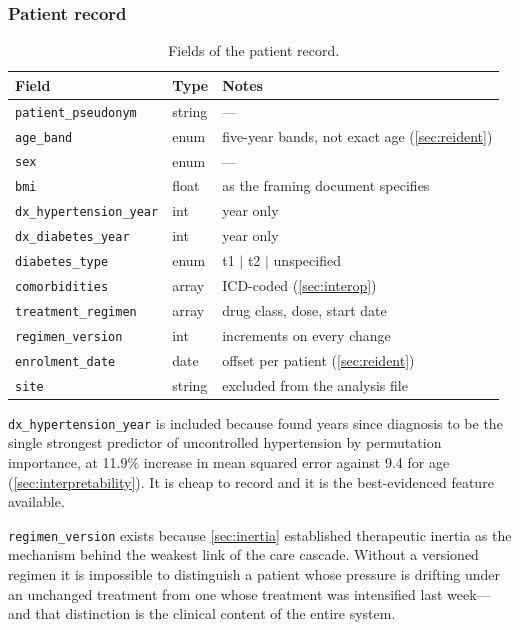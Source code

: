 \documentclass[12pt,a4paper,oneside]{report}
\begin{document}
\subsubsection{Patient record}

\begin{table}[htbp]
\centering\footnotesize
\caption{Fields of the patient record.}\label{tab:patient-record}
\begin{tabularx}{\textwidth}{@{}>{\raggedright\arraybackslash}p{3.4cm} >{\raggedright\arraybackslash}p{2.0cm} X@{}}
\toprule
\textbf{Field} & \textbf{Type} & \textbf{Notes} \\
\midrule
\texttt{patient\_pseudonym} & string & --- \\
\texttt{age\_band} & enum & five-year bands, not exact age (\cref{sec:reident}) \\
\texttt{sex} & enum & --- \\
\texttt{bmi} & float & as the framing document specifies \\
\texttt{dx\_hypertension\_year} & int & year only \\
\texttt{dx\_diabetes\_year} & int & year only \\
\texttt{diabetes\_type} & enum & t1 $\mid$ t2 $\mid$ unspecified \\
\texttt{comorbidities} & array & ICD-coded (\cref{sec:interop}) \\
\texttt{treatment\_regimen} & array & drug class, dose, start date \\
\texttt{regimen\_version} & int & increments on every change \\
\texttt{enrolment\_date} & date & offset per patient (\cref{sec:reident}) \\
\texttt{site} & string & excluded from the analysis file \\
\bottomrule
\end{tabularx}
\end{table}

\texttt{dx\_hypertension\_year} is included because \textcite{mendoza2025} found years since diagnosis to be the single strongest predictor of uncontrolled hypertension by permutation importance, at 11.9\% increase in mean squared error against 9.4 for age (\cref{sec:interpretability}). It is cheap to record and it is the best-evidenced feature available.

\texttt{regimen\_version} exists because \cref{sec:inertia} established therapeutic inertia as the mechanism behind the weakest link of the care cascade. Without a versioned regimen it is impossible to distinguish a patient whose pressure is drifting under an unchanged treatment from one whose treatment was intensified last week---and that distinction is the clinical content of the entire system.
\end{document}
